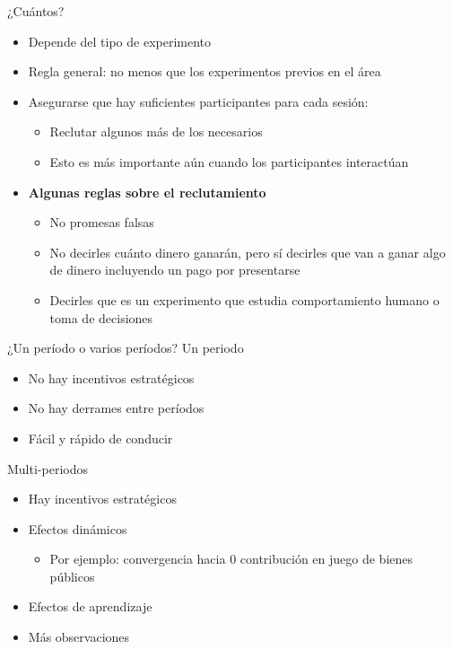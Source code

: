 \documentclass[
  ignorenonframetext,
]{beamer}
\providecommand{\tightlist}{%
  \setlength{\itemsep}{0pt}\setlength{\parskip}{0pt}}
\begin{document}
\begin{frame}{¿Cuántos?}
\protect\hypertarget{cuuxe1ntos}{}
\begin{itemize}
\item
  Depende del tipo de experimento
\item
  Regla general: no menos que los experimentos previos en el área
\item
  Asegurarse que hay suficientes participantes para cada sesión:

  \begin{itemize}
  \tightlist
  \item
    Reclutar algunos más de los necesarios
  \item
    Esto es más importante aún cuando los participantes interactúan
  \end{itemize}
\item
  \textbf{Algunas reglas sobre el reclutamiento}

  \begin{itemize}
  \tightlist
  \item
    No promesas falsas
  \item
    No decirles cuánto dinero ganarán, pero sí decirles que van a ganar
    algo de dinero incluyendo un pago por presentarse
  \item
    Decirles que es un experimento que estudia comportamiento humano o
    toma de decisiones
  \end{itemize}
\end{itemize}
\end{frame}

\begin{frame}{¿Un período o varios períodos?}
\protect\hypertarget{un-peruxedodo-o-varios-peruxedodos}{}
Un periodo

\begin{itemize}
\tightlist
\item
  No hay incentivos estratégicos
\item
  No hay derrames entre períodos
\item
  Fácil y rápido de conducir
\end{itemize}

Multi-periodos

\begin{itemize}
\tightlist
\item
  Hay incentivos estratégicos
\item
  Efectos dinámicos

  \begin{itemize}
  \tightlist
  \item
    Por ejemplo: convergencia hacia 0 contribución en juego de bienes
    públicos
  \end{itemize}
\item
  Efectos de aprendizaje
\item
  Más observaciones
\end{itemize}
\end{frame}
\end{document}

